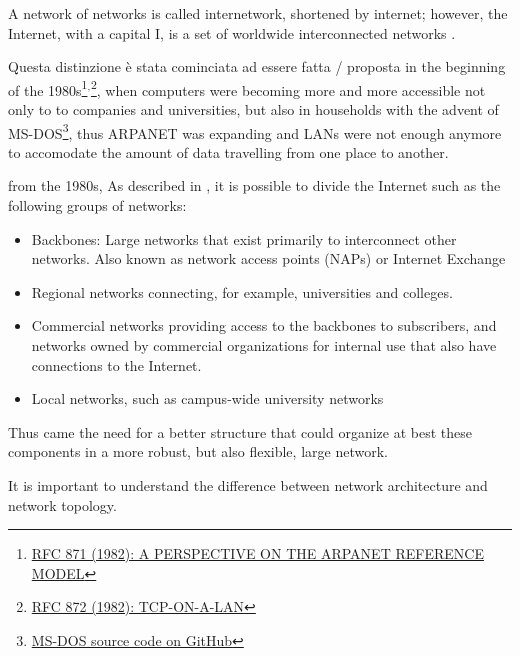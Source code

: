 
	A network of networks is called internetwork, shortened by internet; however, the Internet, with a capital I, is a set of worldwide interconnected networks \cite{gg243376}.
	
	Questa distinzione è stata cominciata ad essere fatta / proposta in the beginning of the 1980s\footnote{\href{https://datatracker.ietf.org/doc/html/rfc871}{RFC 871 (1982): A PERSPECTIVE ON THE ARPANET REFERENCE MODEL}}$^{,}$\footnote{\href{https://datatracker.ietf.org/doc/html/rfc872}{RFC 872 (1982): TCP-ON-A-LAN}}, when computers were becoming more and more accessible not only to to companies and universities, but also in households with the advent of MS-DOS\footnote{\href{https://github.com/microsoft/MS-DOS}{MS-DOS source code on GitHub}}, thus ARPANET was expanding and LANs were not enough anymore to accomodate the amount of data travelling from one place to another.
	
	from the 1980s, As described in \cite{gg243376}, it is possible to divide the Internet such as the following groups of networks:
	\begin{itemize}[noitemsep]
		\item Backbones: Large networks that exist primarily to interconnect other networks. Also known as network access points (NAPs) or Internet Exchange
		\item Regional networks connecting, for example, universities and colleges.
		\item Commercial networks providing access to the backbones to subscribers, and networks owned by commercial organizations for internal use that also have connections to the Internet.
		\item Local networks, such as campus-wide university networks
	\end{itemize}


	Thus came the need for a better structure that could organize at best these components in a more robust, but also flexible, large network.
	
	
	
	It is important to understand the difference between network architecture and network topology.
	
